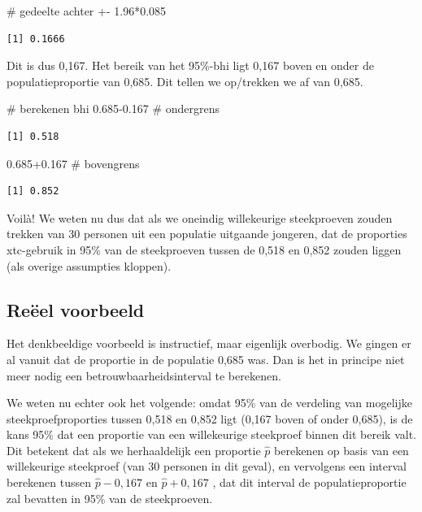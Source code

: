 \documentclass[
  letterpaper,
  DIV=11,
  numbers=noendperiod]{scrreprt}
\newenvironment{Shaded}{\begin{snugshade}}{\end{snugshade}}
\newcommand{\CommentTok}[1]{\textcolor[rgb]{0.37,0.37,0.37}{#1}}
\newcommand{\FloatTok}[1]{\textcolor[rgb]{0.68,0.00,0.00}{#1}}
\newcommand{\SpecialCharTok}[1]{\textcolor[rgb]{0.37,0.37,0.37}{#1}}
\begin{document}
\begin{Shaded}
\begin{Highlighting}[]
\CommentTok{\# gedeelte achter +{-}}
\FloatTok{1.96}\SpecialCharTok{*}\FloatTok{0.085}
\end{Highlighting}
\end{Shaded}

\begin{verbatim}
[1] 0.1666
\end{verbatim}

Dit is dus 0,167. Het bereik van het 95\%-bhi ligt 0,167 boven en onder
de populatieproportie van 0,685. Dit tellen we op/trekken we af van
0,685.

\begin{Shaded}
\begin{Highlighting}[]
\CommentTok{\# berekenen bhi}
\FloatTok{0.685{-}0.167} \CommentTok{\# ondergrens}
\end{Highlighting}
\end{Shaded}

\begin{verbatim}
[1] 0.518
\end{verbatim}

\begin{Shaded}
\begin{Highlighting}[]
\FloatTok{0.685+0.167} \CommentTok{\# bovengrens}
\end{Highlighting}
\end{Shaded}

\begin{verbatim}
[1] 0.852
\end{verbatim}

Voilà! We weten nu dus dat als we oneindig willekeurige steekproeven
zouden trekken van 30 personen uit een populatie uitgaande jongeren, dat
de proporties xtc-gebruik in 95\% van de steekproeven tussen de 0,518 en
0,852 zouden liggen (als overige assumpties kloppen).

\subsection{Reëel voorbeeld}\label{reuxebel-voorbeeld}

Het denkbeeldige voorbeeld is instructief, maar eigenlijk overbodig. We
gingen er al vanuit dat de proportie in de populatie 0,685 was. Dan is
het in principe niet meer nodig een betrouwbaarheidsinterval te
berekenen.

We weten nu echter ook het volgende: omdat 95\% van de verdeling van
mogelijke steekproefproporties tussen 0,518 en 0,852 ligt (0,167 boven
of onder 0,685), is de kans 95\% dat een proportie van een willekeurige
steekproef binnen dit bereik valt. Dit betekent dat als we herhaaldelijk
een proportie \(\hat{p}\) berekenen op basis van een willekeurige
steekproef (van 30 personen in dit geval), en vervolgens een interval
berekenen tussen \(\hat{p}-0,167\) en \(\hat{p}+0,167\) , dat dit
interval de populatieproportie zal bevatten in 95\% van de steekproeven.
\end{document}
